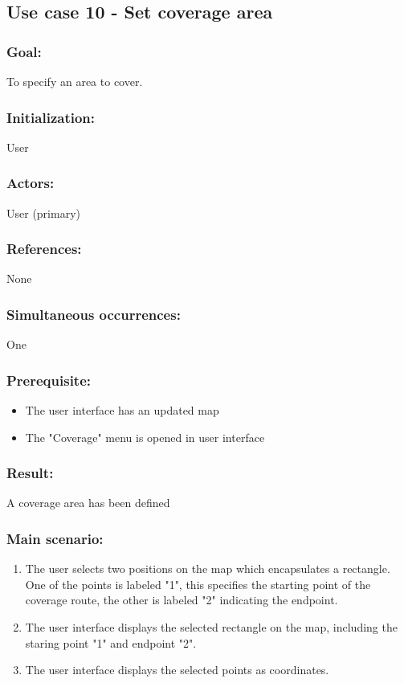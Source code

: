 \begin{framed}
	\subsection{Use case 10 - Set coverage area}
	\subsubsection*{Goal:}
	To specify an area to cover.
	
	\subsubsection*{Initialization:}
	User
	
	\subsubsection*{Actors:}
	User (primary)
	
	\subsubsection*{References:}
	None
	
	\subsubsection*{Simultaneous occurrences:}
	One
	
	\subsubsection*{Prerequisite:}
	\begin{itemize}
		\item The user interface has an updated map
		\item The "Coverage" menu is opened in user interface
	\end{itemize}
	
	\subsubsection*{Result:}
	A coverage area has been defined
	
	\subsubsection*{Main scenario:}
	\begin{enumerate}
		\item The user selects two positions on the map which encapsulates a rectangle. One of the points is labeled "1", this specifies the starting point of the coverage route, the other is labeled "2" indicating the endpoint.
		\item \label{uc10.2} The user interface displays the selected rectangle on the map, including the staring point "1" and endpoint "2".
		\item The user interface displays the selected points as coordinates.
	\end{enumerate}	
	

\end{framed}
